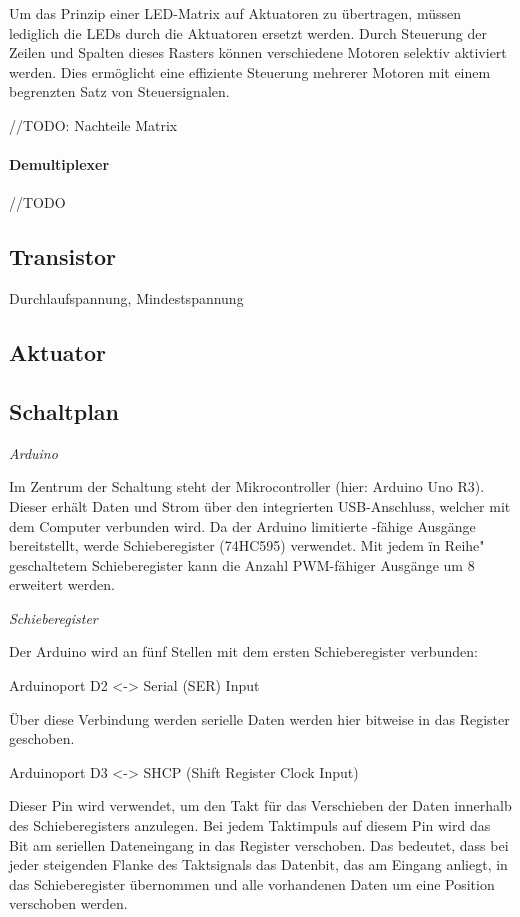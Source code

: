 Um das Prinzip einer LED-Matrix auf Aktuatoren zu übertragen, müssen lediglich die LEDs durch die Aktuatoren ersetzt werden.
Durch Steuerung der Zeilen und Spalten dieses Rasters können verschiedene Motoren selektiv
aktiviert werden. Dies ermöglicht eine effiziente Steuerung mehrerer Motoren mit einem begrenzten Satz von
Steuersignalen. \newline

//TODO: Nachteile Matrix


\paragraph{Demultiplexer}
//TODO

\subsection{Transistor}
Durchlaufspannung, Mindestspannung
\subsection{Aktuator}\label{subsec:aktuator}

\subsection{Schaltplan}

\textit{Arduino}

Im Zentrum der Schaltung steht der Mikrocontroller (hier: Arduino Uno R3).
Dieser erhält Daten und Strom über den integrierten USB-Anschluss, welcher mit dem Computer verbunden wird.
Da der Arduino limitierte -fähige Ausgänge bereitstellt, werde Schieberegister (74HC595) verwendet.
Mit jedem \"in Reihe" geschaltetem Schieberegister kann die Anzahl PWM-fähiger Ausgänge um 8 erweitert werden.

\textit{Schieberegister}

Der Arduino wird an fünf Stellen mit dem ersten Schieberegister verbunden:

Arduinoport D2 <-> Serial (SER) Input

Über diese Verbindung werden serielle Daten werden hier bitweise in das Register geschoben.

Arduinoport D3 <-> SHCP (Shift Register Clock Input)

Dieser Pin wird verwendet, um den Takt für das Verschieben der Daten innerhalb des Schieberegisters anzulegen.
Bei jedem Taktimpuls auf diesem Pin wird das Bit am seriellen Dateneingang in das Register verschoben.
Das bedeutet, dass bei jeder steigenden Flanke des Taktsignals das Datenbit, das am Eingang anliegt, in das Schieberegister übernommen und alle vorhandenen Daten um eine Position verschoben werden.

